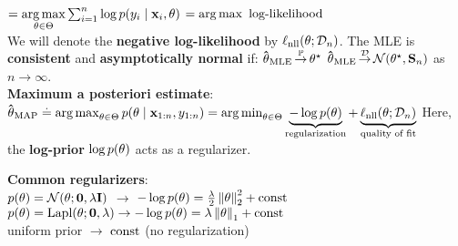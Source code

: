  $ = \underset{\mathbf{\theta} \in \Theta}{\operatorname*{arg\,max}} \sum_{i=1}^n \log p(y_i \mid \mathbf{x}_i, \mathbf{\theta}) $ $ = \operatorname*{arg\,max} \text{ log-likelihood}$ \\
We will denote the \textbf{negative log-likelihood} by $\ell_\mathrm{nll}(\mathbf{\theta}; \mathcal{D}_n)$.
The MLE is \textbf{consistent} and \textbf{asymptotically normal} if: $\mathbf{\hat{\theta}}_{\mathrm{MLE}} \operatorname*{\smash{\overset{\mathbb{P}}{\rightarrow}}} \mathbf{\theta}^\star$ $\vthetahat_\MLE \convd \N{\opt{\vtheta}}{\mS_n}$ as $n \to \infty$. \\
\textbf{Maximum a posteriori estimate}: \\
$\mathbf{\hat{\theta}}_{\mathrm{MAP}} \overset{.}{=} \operatorname*{arg\,max}_{\mathbf{\theta} \in \Theta} p(\mathbf{\theta} \mid \mathbf{x}_{1:n}, y_{1:n}) 
  = \operatorname*{arg\,min}_{\mathbf{\theta} \in \Theta} \underbrace{- \log p(\mathbf{\theta})}_{\text{regularization}} + \underbrace{\ell_\mathrm{nll}(\mathbf{\theta}; \mathcal{D}_n)}_{\text{quality of fit}}$
Here, the \textbf{log-prior} $\log p(\mathbf{\theta})$ acts as a regularizer.\\
\begin{framed}
\textbf{Common regularizers}: \\
 $p(\vtheta) = \N[\vtheta]{\vzero}{\lambda \mI}$ $\rightarrow$ $-\log p(\vtheta) = \frac{\lambda}{2} \norm{\vtheta}_2^2 + \const$ \\
 $p(\vtheta) = \textrm{Lapl}(\vtheta;\vzero,\lambda) \rightarrow -\log p(\vtheta) = \lambda \norm{\vtheta}_1 + \const$ \\
 uniform prior $\rightarrow$ $\mathrm{const}$ (no regularization)
 \end{framed}
